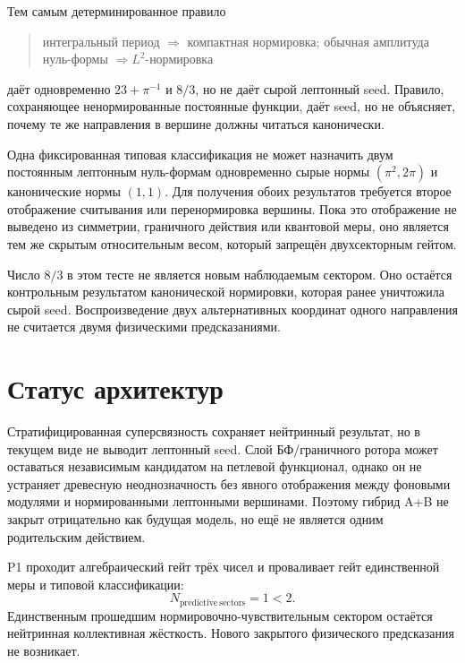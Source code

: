 Тем самым детерминированное правило
\begin{quote}
интегральный период \(\Rightarrow\) компактная нормировка;
обычная амплитуда нуль-формы \(\Rightarrow L^2\)-нормировка
\end{quote}
даёт одновременно \(23+\pi^{-1}\) и \(8/3\), но не даёт сырой
лептонный seed. Правило, сохраняющее ненормированные постоянные функции,
даёт seed, но не объясняет, почему те же направления в вершине должны
читаться канонически.

\begin{nogocriterion}
Одна фиксированная типовая классификация не может назначить двум
постоянным лептонным нуль-формам одновременно сырые нормы
\((\pi^2,2\pi)\) и канонические нормы \((1,1)\). Для получения обоих
результатов требуется второе отображение считывания или перенормировка
вершины. Пока это отображение не выведено из симметрии, граничного действия
или квантовой меры, оно является тем же скрытым относительным весом, который
запрещён двухсекторным гейтом.
\end{nogocriterion}

Число \(8/3\) в этом тесте не является новым наблюдаемым сектором. Оно
остаётся контрольным результатом канонической нормировки, которая ранее
уничтожила сырой seed. Воспроизведение двух альтернативных координат одного
направления не считается двумя физическими предсказаниями.

\section{Статус архитектур}

Стратифицированная суперсвязность сохраняет нейтринный результат, но в
текущем виде не выводит лептонный seed. Слой БФ/граничного ротора может
оставаться независимым кандидатом на петлевой функционал, однако он не
устраняет древесную неоднозначность без явного отображения между фоновыми
модулями и нормированными лептонными вершинами. Поэтому гибрид A+B не
закрыт отрицательно как будущая модель, но ещё не является одним
родительским действием.

\begin{proposition}[Вердикт P1]
P1 проходит алгебраический гейт трёх чисел и проваливает гейт единственной
меры и типовой классификации:
\begin{equation}
 N_{\mathrm{predictive\ sectors}}=1<2.
\end{equation}
Единственным прошедшим нормировочно-чувствительным сектором остаётся
нейтринная коллективная жёсткость. Нового закрытого физического
предсказания не возникает.
\end{proposition}


